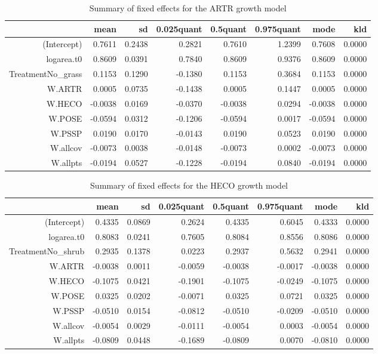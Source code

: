 \begin{table}[ht]
\centering
\caption{Summary of fixed effects for the ARTR growth model} 
\label{ARTRgrowth}
\begin{tabular}{rrrrrrrr}
  \hline
 & mean & sd & 0.025quant & 0.5quant & 0.975quant & mode & kld \\ 
  \hline
(Intercept) & 0.7611 & 0.2438 & 0.2821 & 0.7610 & 1.2399 & 0.7608 & 0.0000 \\ 
  logarea.t0 & 0.8609 & 0.0391 & 0.7840 & 0.8609 & 0.9376 & 0.8609 & 0.0000 \\ 
  TreatmentNo\_grass & 0.1153 & 0.1290 & -0.1380 & 0.1153 & 0.3684 & 0.1153 & 0.0000 \\ 
  W.ARTR & 0.0005 & 0.0735 & -0.1438 & 0.0005 & 0.1447 & 0.0005 & 0.0000 \\ 
  W.HECO & -0.0038 & 0.0169 & -0.0370 & -0.0038 & 0.0294 & -0.0038 & 0.0000 \\ 
  W.POSE & -0.0594 & 0.0312 & -0.1206 & -0.0594 & 0.0017 & -0.0594 & 0.0000 \\ 
  W.PSSP & 0.0190 & 0.0170 & -0.0143 & 0.0190 & 0.0523 & 0.0190 & 0.0000 \\ 
  W.allcov & -0.0073 & 0.0038 & -0.0148 & -0.0073 & 0.0002 & -0.0073 & 0.0000 \\ 
  W.allpts & -0.0194 & 0.0527 & -0.1228 & -0.0194 & 0.0840 & -0.0194 & 0.0000 \\ 
   \hline
\end{tabular}
\end{table}

\begin{table}[ht]
\centering
\caption{Summary of fixed effects for the HECO growth model} 
\label{HECOgrowth}
\begin{tabular}{rrrrrrrr}
  \hline
 & mean & sd & 0.025quant & 0.5quant & 0.975quant & mode & kld \\ 
  \hline
(Intercept) & 0.4335 & 0.0869 & 0.2624 & 0.4335 & 0.6045 & 0.4333 & 0.0000 \\ 
  logarea.t0 & 0.8083 & 0.0241 & 0.7605 & 0.8084 & 0.8556 & 0.8086 & 0.0000 \\ 
  TreatmentNo\_shrub & 0.2935 & 0.1378 & 0.0223 & 0.2937 & 0.5632 & 0.2941 & 0.0000 \\ 
  W.ARTR & -0.0038 & 0.0011 & -0.0059 & -0.0038 & -0.0017 & -0.0038 & 0.0000 \\ 
  W.HECO & -0.1075 & 0.0421 & -0.1901 & -0.1075 & -0.0249 & -0.1075 & 0.0000 \\ 
  W.POSE & 0.0325 & 0.0202 & -0.0071 & 0.0325 & 0.0721 & 0.0325 & 0.0000 \\ 
  W.PSSP & -0.0510 & 0.0154 & -0.0812 & -0.0510 & -0.0209 & -0.0510 & 0.0000 \\ 
  W.allcov & -0.0054 & 0.0029 & -0.0111 & -0.0054 & 0.0003 & -0.0054 & 0.0000 \\ 
  W.allpts & -0.0809 & 0.0448 & -0.1689 & -0.0809 & 0.0070 & -0.0810 & 0.0000 \\ 
   \hline
\end{tabular}
\end{table}

